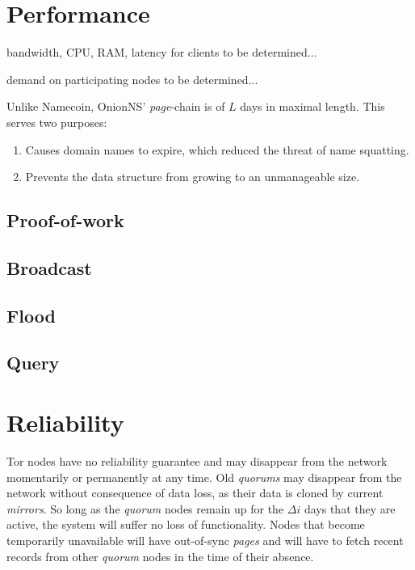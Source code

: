 \section{Performance}

bandwidth, CPU, RAM, latency for clients to be determined...

demand on participating nodes to be determined...

Unlike Namecoin, OnionNS' \emph{page}-chain is of $ L $ days in maximal length. This serves two purposes:

\begin{enumerate}
	\item Causes domain names to expire, which reduced the threat of name squatting.
	\item Prevents the data structure from growing to an unmanageable size.
\end{enumerate}

\subsection{Proof-of-work}

\subsection{Broadcast}

\subsection{Flood}

\subsection{Query}

\section{Reliability}


Tor nodes have no reliability guarantee and may disappear from the network momentarily or permanently at any time. Old \emph{quorums} may disappear from the network without consequence of data loss, as their data is cloned by current \emph{mirrors}. So long as the \emph{quorum} nodes remain up for the $ \Delta i $ days that they are active, the system will suffer no loss of functionality. Nodes that become temporarily unavailable will have out-of-sync \emph{pages} and will have to fetch recent records from other \emph{quorum} nodes in the time of their absence.




